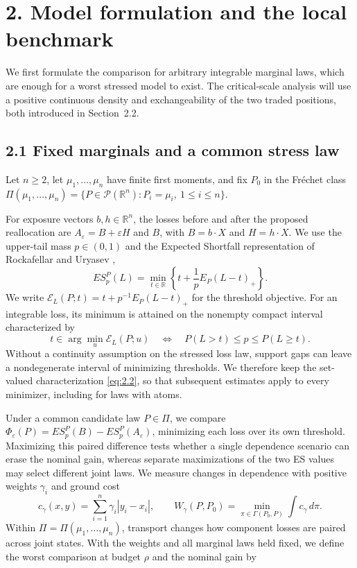 \section{2. Model formulation and the local benchmark}\label{sec:model}

We first formulate the comparison for arbitrary integrable marginal laws, which are enough for a worst stressed model to exist. The critical-scale analysis will use a positive continuous density and exchangeability of the two traded positions, both introduced in Section~2.2.

\subsection{2.1 Fixed marginals and a common stress law}
Let \(n\ge2\), let \(\mu_1,\ldots,\mu_n\) have finite first moments, and fix \(P_0\) in the Fr\'echet class \(\Pi(\mu_1,\ldots,\mu_n)=\{P\in\mathcal P(\mathbb R^n):P_i=\mu_i,\ 1\le i\le n\}\).

For exposure vectors \(b,h\in\mathbb R^n\), the losses before and after the proposed reallocation are
\(A_\varepsilon=B+\varepsilon H\) and \(B\), with \(B=b\cdot X\) and \(H=h\cdot X\).
We use the upper-tail mass \(p\in(0,1)\) and the Expected Shortfall representation of Rockafellar and Uryasev \cite{rockafellar2002},
\begin{equation}
ES_p^P(L)=\min_{t\in\mathbb R}
\left\{t+\frac1pE_P(L-t)_+\right\}.
\tag{2.1}\label{eq:2.1}
\end{equation}
We write \(\mathscr E_L(P;t)=t+p^{-1}E_P(L-t)_+\) for the threshold objective. For an integrable loss, its minimum is attained on the nonempty compact interval characterized by
\begin{equation}
t\in\arg\min_{u}\mathscr E_L(P;u)
\quad\Longleftrightarrow\quad P(L>t)\le p\le P(L\ge t).
\tag{2.2}\label{eq:2.2}
\end{equation}
Without a continuity assumption on the stressed loss law, support gaps can leave a nondegenerate interval of minimizing thresholds. We therefore keep the set-valued characterization \eqref{eq:2.2}, so that subsequent estimates apply to every minimizer, including for laws with atoms.

Under a common candidate law \(P\in\Pi\), we compare \(\Phi_\varepsilon(P)=ES_p^P(B)-ES_p^P(A_\varepsilon)\), minimizing each loss over its own threshold. Maximizing this paired difference tests whether a single dependence scenario can erase the nominal gain, whereas separate maximizations of the two ES values may select different joint laws. We measure changes in dependence with positive weights \(\gamma_i\) and ground cost
\[
c_\gamma(x,y)=\sum_{i=1}^n\gamma_i|y_i-x_i|,
\qquad W_\gamma(P,P_0)=\min_{\pi\in\Gamma(P_0,P)}\int c_\gamma\,d\pi.
\]
Within \(\Pi=\Pi(\mu_1,\ldots,\mu_n)\), transport changes how component losses are paired across joint states. With the weights and all marginal laws held fixed, we define the worst comparison at budget \(\rho\) and the nominal gain by

